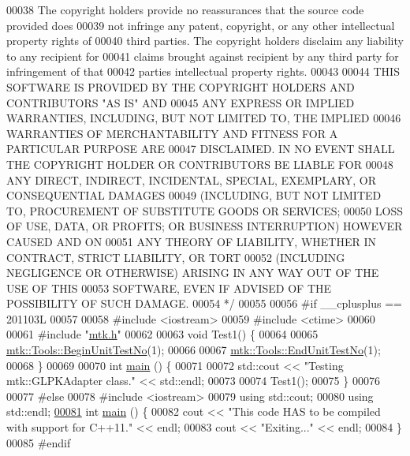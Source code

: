 \begin{DoxyCode}
00038 \textcolor{comment}{The copyright holders provide no reassurances that the source code provided does}
00039 \textcolor{comment}{not infringe any patent, copyright, or any other intellectual property rights of}
00040 \textcolor{comment}{third parties. The copyright holders disclaim any liability to any recipient for}
00041 \textcolor{comment}{claims brought against recipient by any third party for infringement of that}
00042 \textcolor{comment}{parties intellectual property rights.}
00043 \textcolor{comment}{}
00044 \textcolor{comment}{THIS SOFTWARE IS PROVIDED BY THE COPYRIGHT HOLDERS AND CONTRIBUTORS "AS IS" AND}
00045 \textcolor{comment}{ANY EXPRESS OR IMPLIED WARRANTIES, INCLUDING, BUT NOT LIMITED TO, THE IMPLIED}
00046 \textcolor{comment}{WARRANTIES OF MERCHANTABILITY AND FITNESS FOR A PARTICULAR PURPOSE ARE}
00047 \textcolor{comment}{DISCLAIMED. IN NO EVENT SHALL THE COPYRIGHT HOLDER OR CONTRIBUTORS BE LIABLE FOR}
00048 \textcolor{comment}{ANY DIRECT, INDIRECT, INCIDENTAL, SPECIAL, EXEMPLARY, OR CONSEQUENTIAL DAMAGES}
00049 \textcolor{comment}{(INCLUDING, BUT NOT LIMITED TO, PROCUREMENT OF SUBSTITUTE GOODS OR SERVICES;}
00050 \textcolor{comment}{LOSS OF USE, DATA, OR PROFITS; OR BUSINESS INTERRUPTION) HOWEVER CAUSED AND ON}
00051 \textcolor{comment}{ANY THEORY OF LIABILITY, WHETHER IN CONTRACT, STRICT LIABILITY, OR TORT}
00052 \textcolor{comment}{(INCLUDING NEGLIGENCE OR OTHERWISE) ARISING IN ANY WAY OUT OF THE USE OF THIS}
00053 \textcolor{comment}{SOFTWARE, EVEN IF ADVISED OF THE POSSIBILITY OF SUCH DAMAGE.}
00054 \textcolor{comment}{*/}
00055 
00056 \textcolor{preprocessor}{#if \_\_cplusplus == 201103L}
00057 
00058 \textcolor{preprocessor}{#include <iostream>}
00059 \textcolor{preprocessor}{#include <ctime>}
00060 
00061 \textcolor{preprocessor}{#include "\hyperlink{mtk_8h}{mtk.h}"}
00062 
00063 \textcolor{keywordtype}{void} Test1() \{
00064 
00065   \hyperlink{classmtk_1_1Tools_a26ee906d28523378522a75e25c3a4e19}{mtk::Tools::BeginUnitTestNo}(1);
00066 
00067   \hyperlink{classmtk_1_1Tools_ad8cf0085133dd40c913fe195bc5b9694}{mtk::Tools::EndUnitTestNo}(1);
00068 \}
00069 
00070 \textcolor{keywordtype}{int} \hyperlink{mtk__glpk__adapter__test_8cc_ae66f6b31b5ad750f1fe042a706a4e3d4}{main} () \{
00071 
00072   std::cout << \textcolor{stringliteral}{"Testing mtk::GLPKAdapter class."} << std::endl;
00073 
00074   Test1();
00075 \}
00076 
00077 \textcolor{preprocessor}{#else}
00078 \textcolor{preprocessor}{#include <iostream>}
00079 \textcolor{keyword}{using} std::cout;
00080 \textcolor{keyword}{using} std::endl;
\hypertarget{mtk__glpk__adapter__test_8cc_source_l00081}{}\hyperlink{mtk__glpk__adapter__test_8cc_ae66f6b31b5ad750f1fe042a706a4e3d4}{00081} \textcolor{keywordtype}{int} \hyperlink{mtk__glpk__adapter__test_8cc_ae66f6b31b5ad750f1fe042a706a4e3d4}{main} () \{
00082   cout << \textcolor{stringliteral}{"This code HAS to be compiled with support for C++11."} << endl;
00083   cout << \textcolor{stringliteral}{"Exiting..."} << endl;
00084 \}
00085 \textcolor{preprocessor}{#endif}
\end{DoxyCode}
